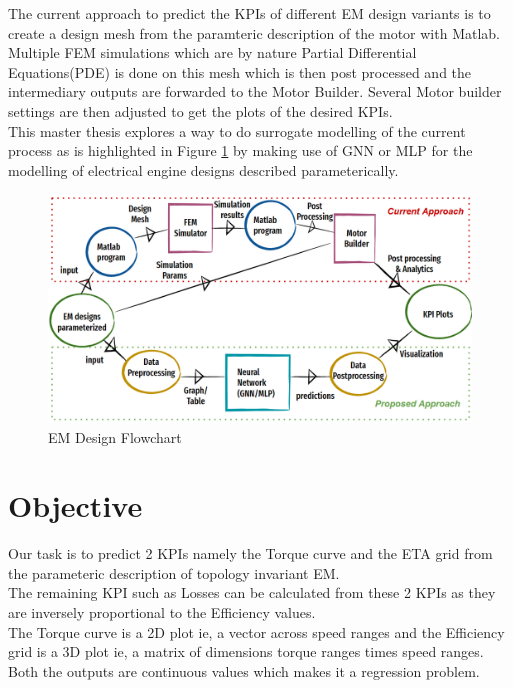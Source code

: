 \documentclass{report} %
\begin{document}
The current approach to predict the \ac{KPI}s of different \ac{EM} design variants is to create a design mesh from the paramteric description of the motor with Matlab.
Multiple FEM simulations which are by nature Partial Differential Equations(PDE) is done on this mesh which is then post processed and the intermediary outputs are forwarded to the Motor Builder.
Several Motor builder settings are then adjusted to get the plots of the desired \ac{KPI}s.\\
This master thesis explores a way to do surrogate modelling of the current process as is highlighted in Figure \ref{fig:EM Design Flowchart} by making use of \ac{GNN} or \ac{MLP} for the modelling of electrical engine designs described parameterically. \\
\begin{figure}[H]
    \centering
    \includegraphics[width=1\textwidth]{./ReportImages/EM_design_flowchart_v2.png} 
    \caption{EM Design Flowchart}
    \label{fig:EM Design Flowchart}
\end{figure}


\section{Objective}\label{sec:Objective}
Our task is to predict 2 KPIs namely the Torque curve and the ETA grid from the parameteric description of topology invariant \ac{EM}. \\ 
The remaining \ac{KPI} such as Losses can be calculated from these 2 KPIs as they are inversely proportional to the Efficiency values.\\
The Torque curve is a 2D plot ie, a vector across speed ranges and the Efficiency grid is a 3D plot ie, a matrix of dimensions torque ranges times speed ranges. \\
Both the outputs are continuous values which makes it a regression problem. \\
\end{document}
